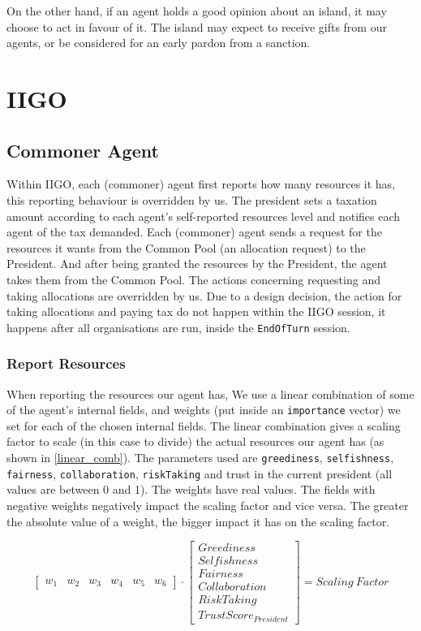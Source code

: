 On the other hand, if an agent holds a good opinion about an island, it may choose to act in favour of it. The island may expect to receive gifts from our agents, or be considered for an early pardon from a sanction.


\section{IIGO}
\subsection{Commoner Agent}
Within IIGO, each (commoner) agent first reports how many resources it has, this reporting behaviour is overridden by us. The president sets a taxation amount according to each agent's self-reported resources level and notifies each agent of the tax demanded. Each (commoner) agent sends a request for the resources it wants from the Common Pool (an allocation request) to the President. And after being granted the resources by the President, the agent takes them from the Common Pool. The actions concerning requesting and taking allocations are overridden by us. Due to a design decision, the action for taking allocations and paying tax do not happen within the IIGO session, it happens after all organisations are run, inside the \texttt{EndOfTurn} session.

\subsubsection{Report Resources}
When reporting the resources our agent has, We use a linear combination of some of the agent's internal fields, and weights (put inside an \texttt{importance} vector) we set for each of the chosen internal fields. The linear combination gives a scaling factor to scale (in this case to divide) the actual resources our agent has (as shown in \eqref{linear_comb}). The parameters used are \texttt{greediness}, \texttt{selfishness}, \texttt{fairness}, \texttt{collaboration}, \texttt{riskTaking} and trust in the current president (all values are between 0 and 1). The weights have real values. The fields with negative weights negatively impact the scaling factor and vice versa. The greater the absolute value of a weight, the bigger impact it has on the scaling factor.

\begin{equation}\label{linear_comb}
    \begin{bmatrix}
        w_{1}& w_{2}& w_{3}& w_{4}& w_{5}& w_{6}
    \end{bmatrix}
    \cdot
    \begin{bmatrix}
    Greediness \\ 
    Selfishness \\ 
    Fairness \\ 
    Collaboration \\ 
    RiskTaking \\
    TrustScore_{President}
    \end{bmatrix}
    = Scaling\:Factor
\end{equation}

